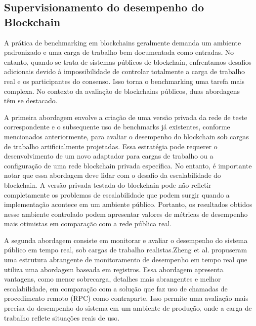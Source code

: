    \subsection{Supervisionamento do desempenho do Blockchain}

    A prática de benchmarking em blockchains geralmente demanda um ambiente padronizado e uma carga de trabalho bem documentada como entradas. No entanto, quando se trata de sistemas públicos de blockchain, enfrentamos desafios adicionais devido à impossibilidade de controlar totalmente a carga de trabalho real e os participantes do consenso. Isso torna o benchmarking uma tarefa mais complexa. No contexto da avaliação de blockchains públicos, duas abordagens têm se destacado.

    A primeira abordagem envolve a criação de uma versão privada da rede de teste correspondente e o subsequente uso de benchmarks já existentes, conforme mencionados anteriormente, para avaliar o desempenho do blockchain sob cargas de trabalho artificialmente projetadas. Essa estratégia pode requerer o desenvolvimento de um novo adaptador para cargas de trabalho ou a configuração de uma rede blockchain privada específica. No entanto, é importante notar que essa abordagem deve lidar com o desafio da escalabilidade do blockchain. A versão privada testada do blockchain pode não refletir completamente os problemas de escalabilidade que podem surgir quando a implementação acontece em um ambiente público. Portanto, os resultados obtidos nesse ambiente controlado podem apresentar valores de métricas de desempenho mais otimistas em comparação com a rede pública real.

    A segunda abordagem consiste em monitorar e avaliar o desempenho do sistema público em tempo real, sob cargas de trabalho realistas.Zheng et al. \cite{zhou2020solutions} propuseram uma estrutura abrangente de monitoramento de desempenho em tempo real que utiliza uma abordagem baseada em registros. Essa abordagem apresenta vantagens, como menor sobrecarga, detalhes mais abrangentes e melhor escalabilidade, em comparação com a solução que faz uso de chamadas de procedimento remoto (RPC) como contraparte. Isso permite uma avaliação mais precisa do desempenho do sistema em um ambiente de produção, onde a carga de trabalho reflete situações reais de uso.\cite{9129732}



